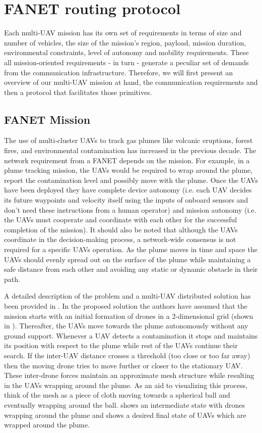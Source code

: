 \chapter{FANET routing protocol}
Each multi-UAV mission has its own set of requirements in terms of size and number of vehicles, the size of the mission's region, payload, mission duration, environmental constraints, level of autonomy and mobility requirements. These all mission-oriented requirements - in turn - generate a peculiar set of demands from the communication infrastructure. Therefore, we will first present an overview of our multi-UAV mission at hand, the communication requirements and then a protocol that facilitates those primitives.

\section{FANET Mission}

The use of multi-cluster UAVs to track gas plumes like volcanic eruptions, forest fires, and environmental contamination has increased in the previous decade. The network requirement from a FANET depends on the mission. For example, in a plume tracking mission, the UAVs would be required to wrap around the plume, report the contamination level and possibly move with the plume. Once the UAVs have been deployed they have complete device autonomy (i.e. each UAV decides its future waypoints and velocity itself using the inputs of onboard sensors and don't need these instructions from a human operator) and mission autonomy (i.e. the UAVs must cooperate and coordinate with each other for the successful completion of the mission). It should also be noted that although the UAVs coordinate in the decision-making process, a network-wide consensus is not required for a specific UAVs operation. As the plume moves in time and space the UAVs should evenly spread out on the surface of the plume while maintaining a safe distance from each other and avoiding any static or dynamic obstacle in their path. 

A detailed description of the problem and a multi-UAV distributed solution has been provided in \cite{8080382}. In the proposed solution the authors have assumed that the mission starts with an initial formation of drones in a 2-dimensional grid (shown in ). Thereafter, the UAVs move towards the plume autonomously without any ground support. Whenever a UAV detects a contamination it stops and maintains its position with respect to the plume while rest of the UAVs continue their search. If the inter-UAV distance crosses a threshold (too close or too far away) then the moving drone tries to move further or closer to the stationary UAV. These inter-drone forces maintain an approximate mesh structure while resulting in the UAVs wrapping around the plume. As an aid to visualizing this process, think of the mesh as a piece of cloth moving towards a spherical ball and eventually wrapping around the ball.  shows an intermediate state with drones wrapping around the plume and  shows a desired final state of UAVs which are wrapped around the plume.
  

